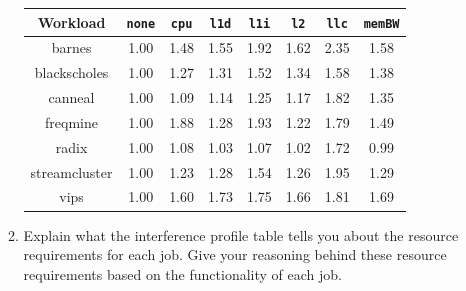 \begin{enumerate}
\begin{enumerate}
\begin{center}
\begin{tabular}{ |c|c|c|c|c|c|c|c| } 
\hline
 \textbf{Workload} & \texttt{\textbf{none}} & \texttt{\textbf{cpu}} & \texttt{\textbf{l1d}} & \texttt{\textbf{l1i}} & \texttt{\textbf{l2}} & \texttt{\textbf{llc}} & \texttt{\textbf{memBW}}  \\
 \hline\hline
barnes         & 1.00 & \cellcolor{orange}1.48 & \cellcolor{orange}1.55 & \cellcolor{orange}1.92 & \cellcolor{orange}1.62 & \cellcolor{red}2.35 & \cellcolor{orange}1.58 \\  \hline
blackscholes   & 1.00 & \cellcolor{Green}1.27 & \cellcolor{orange}1.31 & \cellcolor{orange}1.52 & \cellcolor{orange}1.34 & \cellcolor{orange}1.58 & \cellcolor{orange}1.38 \\  \hline
canneal        & 1.00 & \cellcolor{Green}1.09 & \cellcolor{Green}1.14 & \cellcolor{Green}1.25 & \cellcolor{Green}1.17 & \cellcolor{orange}1.82 & \cellcolor{orange}1.35 \\  \hline
freqmine       & 1.00 & \cellcolor{orange}1.88 & \cellcolor{Green}1.28 & \cellcolor{orange}1.93 & \cellcolor{Green}1.22 & \cellcolor{orange}1.79 & \cellcolor{orange}1.49 \\  \hline
radix          & 1.00 & \cellcolor{Green}1.08 & \cellcolor{Green}1.03 & \cellcolor{Green}1.07 & \cellcolor{Green}1.02 & \cellcolor{orange}1.72 & \cellcolor{Green}0.99 \\  \hline
streamcluster  & 1.00 & \cellcolor{Green}1.23 & \cellcolor{Green}1.28 & \cellcolor{orange}1.54 & \cellcolor{Green}1.26 & \cellcolor{orange}1.95 & \cellcolor{Green}1.29 \\  \hline
vips           & 1.00 & \cellcolor{orange}1.60 & \cellcolor{orange}1.73 & \cellcolor{orange}1.75 & \cellcolor{orange}1.66 & \cellcolor{orange}1.81 & \cellcolor{orange}1.69 \\  \hline
\end{tabular}
\end{center}



\item Explain what the interference profile table tells you about the resource requirements for each job. Give your reasoning behind these resource requirements based on the functionality of each job.


\end{enumerate}
\end{enumerate}
